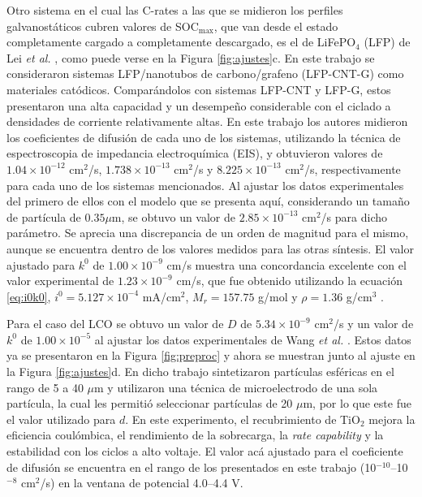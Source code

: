 Otro sistema en el cual las C-rates a las que se midieron los perfiles 
galvanostáticos cubren valores de SOC$_{\max}$, que van desde el estado completamente cargado
a completamente descargado, es el de LiFePO$_4$ (LFP) de Lei \textit{et al.} 
\cite{lei2015}, como puede verse en la Figura \ref{fig:ajustes}c. En este trabajo 
se consideraron sistemas LFP/nanotubos de carbono/grafeno (LFP-CNT-G) como 
materiales catódicos. Comparándolos con sistemas LFP-CNT y LFP-G, estos 
presentaron una alta capacidad y un desempeño considerable con el ciclado a 
densidades de corriente relativamente altas. En este trabajo los autores midieron 
los coeficientes de difusión de cada uno de los sistemas, utilizando la técnica de 
espectroscopia de impedancia electroquímica (EIS), y obtuvieron valores de 
$1.04\times10^{-12}$ cm$^2$/s, $1.738\times10^{-13}$ cm$^2$/s y 
$8.225\times10^{-13}$ cm$^2$/s, respectivamente para cada uno de los sistemas 
mencionados. Al ajustar los datos experimentales del primero de ellos
con el modelo que se presenta aquí, considerando un tamaño de partícula de 
$0.35 \mu$m, se obtuvo un valor de $2.85\times10^{-13}$ cm$^2$/s para dicho 
parámetro. Se aprecia una discrepancia de un orden de magnitud para el mismo, 
aunque se encuentra dentro de los valores medidos para las otras síntesis. 
El valor ajustado para $k^0$ de $1.00\times10^{-9}$ cm/s muestra una
concordancia excelente con el valor experimental de $1.23\times10^{-9}$ cm/s, que
fue obtenido utilizando la ecuación \ref{eq:i0k0}, 
$i^0=5.127\times10^{-4}$ mA/cm$^2$, $M_r = 157.75$ g/mol y 
$\rho = 1.36$ g/cm$^3$ \cite{jin2018}.

Para el caso del LCO se obtuvo un valor de $D$ de $5.34\times10^{-9}$ cm$^2$/s y
un valor de $k^0$ de $1.00\times10^{-5}$ al ajustar los datos experimentales 
de Wang \textit{et al.} \cite{wang2019high}. Estos datos ya se presentaron en la Figura \ref{fig:preproc} y ahora se muestran junto al ajuste en la Figura \ref{fig:ajustes}d.
En dicho trabajo sintetizaron partículas esféricas en el rango
de 5 a 40 $\mu$m y utilizaron una técnica de microelectrodo de una sola partícula,
la cual les permitió seleccionar partículas de 20 $\mu$m, por lo que este fue el
valor utilizado para $d$. En este experimento, el recubrimiento de TiO$_2$ mejora 
la eficiencia coulómbica, el rendimiento de la sobrecarga, la 
\textit{rate capability} y la estabilidad con los ciclos a alto voltaje. El valor 
acá ajustado para el coeficiente de difusión se encuentra en el rango de los 
presentados en este trabajo (10$^{-10}$--10$^{-8}$ cm$^2$/s) en la ventana de potencial
4.0--4.4 V.

